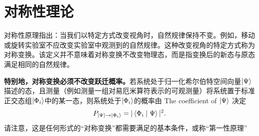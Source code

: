 \section{对称性理论}
对称性原理指出：当我们以特定方式改变视角时，自然规律保持不变。例如，移动或旋转实验室不应改变实验室中观测到的自然规律。这种改变视角的特定方式称为对称变换。该定义并不意味着对称变换不改变物理态，而是指变换后的新态与原态满足相同的自然规律。\par
\textbf{特别地，对称变换必须不改变跃迁概率。}若系统处于归一化希尔伯特空间向量$\ket{\Psi}$描述的态，且测量（例如测量一组对易厄米算符表示的可观测量）将系统置于标准正交态组$\ket{\Phi_i}$中的某一态，则系统处于$\ket{\Phi_i}$的概率由 The coefficient of $\ket{\Psi}$ 决定
\begin{equation}
	{P_{\left| \Psi  \right\rangle  \to \left| {{\Phi _i}} \right\rangle }} = |\left\langle {{{\Phi _i}}}
	\mathrel{\left | {\vphantom {{{\Phi _i}} \Psi }}
		\right. \kern-\nulldelimiterspace}
	{\Psi } \right\rangle {|^2}.
\end{equation}
请注意，这是任何形式的“对称变换”都需要满足的基本条件，或称“第一性原理”\par
